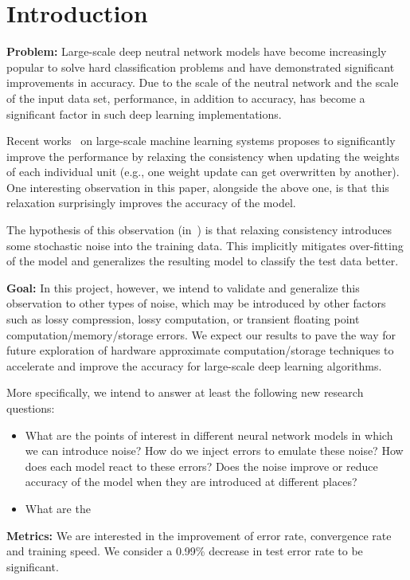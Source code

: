 \section{Introduction}
\label{sec:intro}


{\bf Problem:}
Large-scale deep neutral network models have become increasingly popular
to solve hard classification problems and have demonstrated significant
improvements in accuracy. Due to the scale of the neutral network and the
scale of the input data set, performance, in addition to accuracy, has
become a significant factor in such deep learning implementations.

Recent works~\cite{dean2012large, chilimbi14adam} on large-scale machine
learning systems proposes to significantly improve the performance by relaxing
the consistency when updating the weights of each individual unit (e.g., one
weight update can get overwritten by another). One interesting observation in
this paper, alongside the above one, is that this relaxation surprisingly
improves the accuracy of the model.

The hypothesis of this observation (in~\cite{chilimbi14adam}) is that relaxing
consistency introduces some stochastic noise into the training data. This
implicitly mitigates over-fitting of the model and generalizes the resulting
model to classify the test data better.

{\bf Goal:}
In this project, however, we intend to validate and generalize this observation
to other types of noise, which may be introduced by other factors such as lossy
compression, lossy computation, or transient floating point
computation/memory/storage errors. We expect our results to pave the way for
future exploration of hardware approximate computation/storage techniques to
accelerate and improve the accuracy for large-scale deep learning algorithms.

More specifically, we intend to answer at least the following new research questions:
\begin{itemize}
  \item What are the points of interest in different neural network models in
    which we can introduce noise? How do we inject errors to emulate these
    noise? How does each model react to these errors? Does the noise improve or
    reduce accuracy of the model when they are introduced at different places?
  \item What are the 
\end{itemize}

{\bf Metrics:} %
We are interested in the improvement of error rate, convergence rate
and training speed.
We consider a 0.99\% decrease in test error rate to be significant.




